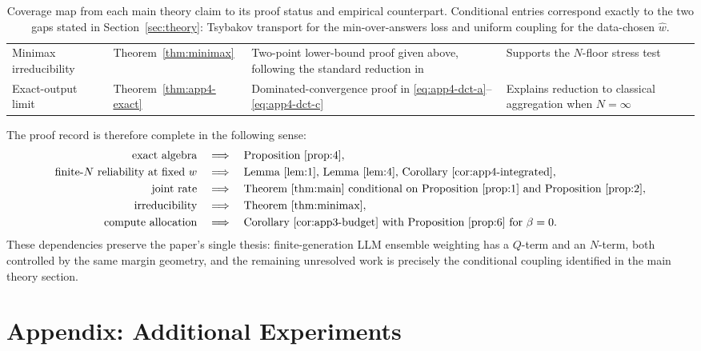 \documentclass{article} %
\providecommand{\what}{\widehat{w}}
\begin{document}
\begin{table}[t]
\begin{tabular}{p{}p{}p{}p{}}
Minimax irreducibility & Theorem~\ref{thm:minimax} & Two-point lower-bound proof given above, following the standard reduction in \cite{tsybakov2009introduction} & Supports the \(N\)-floor stress test \\
Exact-output limit & Theorem~\ref{thm:app4-exact} & Dominated-convergence proof in \eqref{eq:app4-dct-a}--\eqref{eq:app4-dct-c} & Explains reduction to classical aggregation when \(N=\infty\) \\
\bottomrule
\end{tabular}
\caption{Coverage map from each main theory claim to its proof status and empirical counterpart.  Conditional entries correspond exactly to the two gaps stated in Section~\ref{sec:theory}: Tsybakov transport for the min-over-answers loss and uniform coupling for the data-chosen \(\what\).}
\label{tab:proof-map}
\end{table}

The proof record is therefore complete in the following sense:
\begin{align}
\text{exact algebra}
&\quad\Longrightarrow\quad
\text{Proposition~\ref{prop:4}},
\label{eq:app4-close-a}
\\
\text{finite-\(N\) reliability at fixed \(w\)}
&\quad\Longrightarrow\quad
\text{Lemma~\ref{lem:1}, Lemma~\ref{lem:4}, Corollary~\ref{cor:app4-integrated}},
\label{eq:app4-close-b}
\\
\text{joint rate}
&\quad\Longrightarrow\quad
\text{Theorem~\ref{thm:main} conditional on Proposition~\ref{prop:1} and Proposition~\ref{prop:2}},
\label{eq:app4-close-c}
\\
\text{irreducibility}
&\quad\Longrightarrow\quad
\text{Theorem~\ref{thm:minimax}},
\label{eq:app4-close-d}
\\
\text{compute allocation}
&\quad\Longrightarrow\quad
\text{Corollary~\ref{cor:app3-budget} with Proposition~\ref{prop:6} for \(\beta=0\)}.
\label{eq:app4-close-e}
\end{align}
These dependencies preserve the paper's single thesis: finite-generation LLM ensemble weighting has a \(Q\)-term and an \(N\)-term, both controlled by the same margin geometry, and the remaining unresolved work is precisely the conditional coupling identified in the main theory section.


\section{Appendix: Additional Experiments}
\label{app:experiments}
\end{document}
